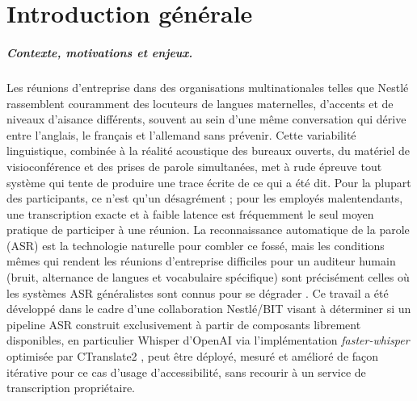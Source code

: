 \documentclass[12pt]{report}
\begin{document}
\chapter*{Introduction générale}
\thispagestyle{fancy}
\setcounter{page}{1}
\paragraph{Contexte, motivations et enjeux.}
Les réunions d'entreprise dans des organisations multinationales telles que Nestlé rassemblent couramment des locuteurs de langues maternelles, d'accents et de niveaux d'aisance différents, souvent au sein d'une même conversation qui dérive entre l'anglais, le français et l'allemand sans prévenir. Cette variabilité linguistique, combinée à la réalité acoustique des bureaux ouverts, du matériel de visioconférence et des prises de parole simultanées, met à rude épreuve tout système qui tente de produire une trace écrite de ce qui a été dit. Pour la plupart des participants, ce n'est qu'un désagrément ; pour les employés malentendants, une transcription exacte et à faible latence est fréquemment le seul moyen pratique de participer à une réunion. La reconnaissance automatique de la parole (ASR) est la technologie naturelle pour combler ce fossé, mais les conditions mêmes qui rendent les réunions d'entreprise difficiles pour un auditeur humain (bruit, alternance de langues et vocabulaire spécifique) sont précisément celles où les systèmes ASR généralistes sont connus pour se dégrader \cite{radford2023robust,baevski2020wav2vec}. Ce travail a été développé dans le cadre d'une collaboration Nestlé/BIT visant à déterminer si un pipeline ASR construit exclusivement à partir de composants librement disponibles, en particulier Whisper d'OpenAI via l'implémentation \textit{faster-whisper} optimisée par CTranslate2 \cite{fasterwhisper2023}, peut être déployé, mesuré et amélioré de façon itérative pour ce cas d'usage d'accessibilité, sans recourir à un service de transcription propriétaire.
\end{document}
